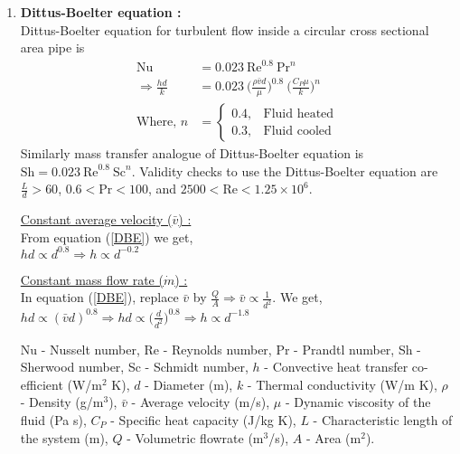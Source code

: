 \documentclass[a4paper, 12 pt]{article}
\begin{document}
\begin{enumerate}
    \item \textbf{Dittus-Boelter equation :} \\Dittus-Boelter equation for turbulent flow inside a circular cross sectional area pipe is
        \begin{align}
            \text{Nu} &= 0.023 \ \text{Re}^{0.8}\ \text{Pr}^{n}\\
            \Rightarrow \frac{hd}{k} &= 0.023 \ \bigg( \frac{\rho \bar{v} d}{\mu} \bigg)^{0.8}\ \bigg( \frac{C_P \mu}{k} \bigg)^{n} \label{DBE}\\
            \text{Where, } \nonumber n &= 
            \begin{cases}
            0.4, &\text{Fluid heated} \\
            0.3, &\text{Fluid cooled}
            \end{cases}
        \end{align}
        Similarly mass transfer analogue of Dittus-Boelter equation is $\text{Sh} = 0.023 \ \text{Re}^{0.8}\ \text{Sc}^{n}$. Validity checks to use the Dittus-Boelter equation are $\frac{L}{d} > 60$, $0.6<\text{Pr}<100$, and $2500<\text{Re}<1.25\times 10^6$.\\ 
        
        
        \begin{minipage}{.45\textwidth}
        \underline{Constant average velocity ($\bar{v}$) :}\\  From equation (\ref{DBE}) we get, \\ $hd \propto d^{0.8} \Rightarrow \boxed{h \propto d^{-0.2}}$\\
        \end{minipage}%
        \vline\hfill
        \begin{minipage}[c]{0.45\textwidth}
        \underline{Constant mass flow rate ($\dot{m}$) :} \\ In equation (\ref{DBE}), replace $\bar{v}$ by $\frac{Q}{A} \Rightarrow \bar{v} \propto \frac{1}{d^2}$. We get,\\ $hd \propto (\bar{v}d)^{0.8} \Rightarrow hd \propto \big( \frac{d}{d^2} \big) ^{0.8} \Rightarrow \boxed{h \propto d^{-1.8}}$
        \end{minipage}
        
        \vspace{3 mm} Nu -  Nusselt number, Re - Reynolds  number, Pr -  Prandtl number, Sh - Sherwood  number, Sc -  Schmidt number, $h$ - Convective heat transfer co-efficient (W/m$^2$ K), $d$ - Diameter (m), $k$ - Thermal conductivity (W/m K), $\rho$ - Density (g/m$^3$), $\bar{v}$ - Average velocity (m/s),
        $\mu$ - Dynamic viscosity of the fluid (Pa s), $C_P$ - Specific heat capacity (J/kg K), $L$ - Characteristic length of the system (m), $Q$ - Volumetric flowrate (m$^3$/s), $A$ - Area (m$^2$).
        

\end{enumerate}
\end{document}
